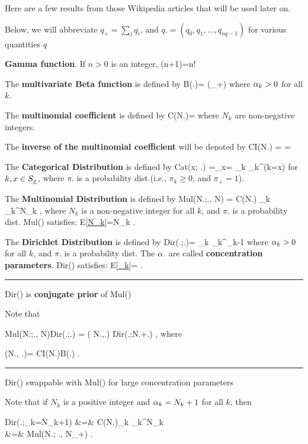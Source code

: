 Here are a few 
results 
from those Wikipedia
articles that will be used later on.

Below,
we will abbreviate
$q_+=\sum_i q_i$, and
$q.=(q_0, q_1, \ldots, q_{nq-1})$
for various quantities $q$

{\bf Gamma function}. If $n>0$ is an integer,
\beq
\Gamma(n+1)=n!
\eeq

The {\bf multivariate Beta function} 
is defined by
\beq
B(\alp.)=
{\Gamma(\alp_+)}
\eeq
where $\alpha_k>0$ for all $k$.

The {\bf multinomial coefficient}
is defined by
\beq
C(N.)=
\eeq
where $N_k$ are non-negative
integers.

The {\bf inverse of the multinomial 
coefficient} will
be denoted by
\beq
CI(N.)
=
=
\eeq

The {\bf Categorical Distribution}
is defined by
\beq
Cat(x; \pi.)
=\pi_x=
\prod_{k} \pi_k^{\indi(k=x)}
\eeq
for $k, x\in S_{\underline{x}}$,
where 
$\pi.$ is a
probability dist.(i.e., $\pi_k\geq 0$,
and $\pi_+=1$).



The {\bf Multinomial Distribution}
is defined by
\beq
Mul(N.;\pi., N)
=
C(N.)
\prod_k \pi_k^{N_k}
\;,
\eeq
where $N_k$
is a non-negative
integer for all $k$,
and $\pi.$
is a probability dist.
Mul() satisfies:
\beq
E[\ul{N_k}]=N\pi_k
\;.
\label{eq-exp-val-mul}
\eeq

The {\bf Dirichlet Distribution}
is defined by
\beq
Dir(\pi.;\alp.)=
\prod_k
\pi_k^{\alp_k-1}
\eeq
where $\alpha_k>0$
for all $k$,
and $\pi.$
is a probability dist.
The
$\alpha.$ are called 
{\bf concentration parameters}.
Dir() satisfies:
\beq
E[\ul{\pi_k}]=
\;.
\label{eq-exp-val-dir}
\eeq


\hrule\noindent
Dir() is {\bf conjugate prior} of  Mul()

Note that

\beq
Mul(N.;\pi., N)Dir(\pi.;\alp.)
=
\calk( N.,\alp.)
Dir(\pi.;N.+\alp.)
\;,
\eeq
where

\beq
\calk(N., \alp.)=
{CI(N.)B(\alp.)}
\;.
\eeq
\hrule\noindent
Dir() swappable with Mul()
for large concentration parameters

Note that if $N_k$ is a positive  integer
and
$\alpha_k=N_k+1$ for all $k$, then

\beqa 
Dir(\pi.;\alp_k=N_k+1)
&=&
C(N.)\prod_k \pi_k^{N_k}
\\
&=&
Mul(N.; \pi., N_+)
\;.
\eeqa

